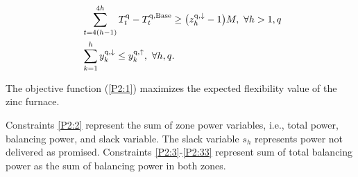 \documentclass[conference]{IEEEtran}
\begin{document}
\begin{subequations}
\begin{align}
        \  & \sum_{t=4(h-1)}^{4 h} T^{\rm{q}}_{t} - T^{\rm{q}, \rm{Base}}_{t} \geq \big( z^{\rm{q},\downarrow}_{h} -1\big)  M,  \  \forall{h>1,q} \label{rebound:3}                                                                                                                                                                                                                                                                                                                                                                                 \\
        \  & \sum_{k=1}^{h} y^{\rm{q},\downarrow}_{k} \leq y^{\rm{q},\uparrow}_{k}, \ \forall{h,q}. \label{up_reg_first}
    \end{align}
\end{subequations}

The objective function (\ref{P2:1}) maximizes the expected flexibility value of the zinc furnace.
%

Constraints \eqref{P2:2} represent the sum of zone power variables, i.e., total power, balancing power, and slack variable. The slack variable $s_h$ represents power not delivered as promised. Constraints \eqref{P2:3}-\eqref{P2:33} represent sum of total balancing power as the sum of balancing power in both zones.
\end{document}

